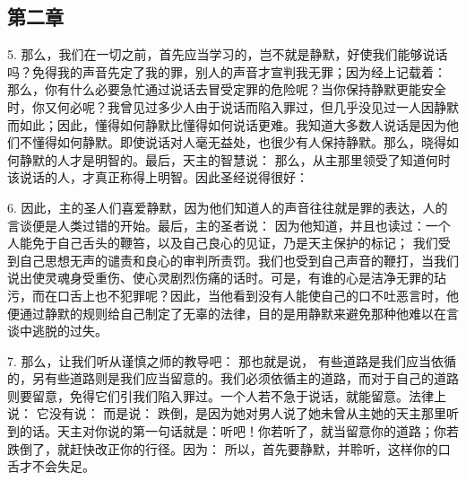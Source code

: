 
\subsection{第二章}

\par

5. 那么，我们在一切之前，首先应当学习的，岂不就是静默，好使我们能够说话吗？免得我的声音先定了我的罪，别人的声音才宣判我无罪；因为经上记载着：  那么，你有什么必要急忙通过说话去冒受定罪的危险呢？当你保持静默更能安全时，你又何必呢？我曾见过多少人由于说话而陷入罪过，但几乎没见过一人因静默而如此；因此，懂得如何静默比懂得如何说话更难。我知道大多数人说话是因为他们不懂得如何静默。即使说话对人毫无益处，也很少有人保持静默。那么，晓得如何静默的人才是明智的。最后，天主的智慧说： 那么，从主那里领受了知道何时该说话的人，才真正称得上明智。因此圣经说得很好： \par

6. 因此，主的圣人们喜爱静默，因为他们知道人的声音往往就是罪的表达，人的言谈便是人类过错的开始。最后，主的圣者说： 因为他知道，并且也读过：一个人能免于自己舌头的鞭笞，以及自己良心的见证，乃是天主保护的标记； 我们受到自己思想无声的谴责和良心的审判所责罚。我们也受到自己声音的鞭打，当我们说出使灵魂身受重伤、使心灵剧烈伤痛的话时。可是，有谁的心是洁净无罪的玷污，而在口舌上也不犯罪呢？因此，当他看到没有人能使自己的口不吐恶言时，他便通过静默的规则给自己制定了无辜的法律，目的是用静默来避免那种他难以在言谈中逃脱的过失。\par

7. 那么，让我们听从谨慎之师的教导吧： 那也就是说， 有些道路是我们应当依循的，另有些道路则是我们应当留意的。我们必须依循主的道路，而对于自己的道路则要留意，免得它们引我们陷入罪过。一个人若不急于说话，就能留意。法律上说：  它没有说： 而是说： 跌倒，是因为她对男人说了她未曾从主她的天主那里听到的话。天主对你说的第一句话就是：听吧！你若听了，就当留意你的道路；你若跌倒了，就赶快改正你的行径。因为： 所以，首先要静默，并聆听，这样你的口舌才不会失足。\par

